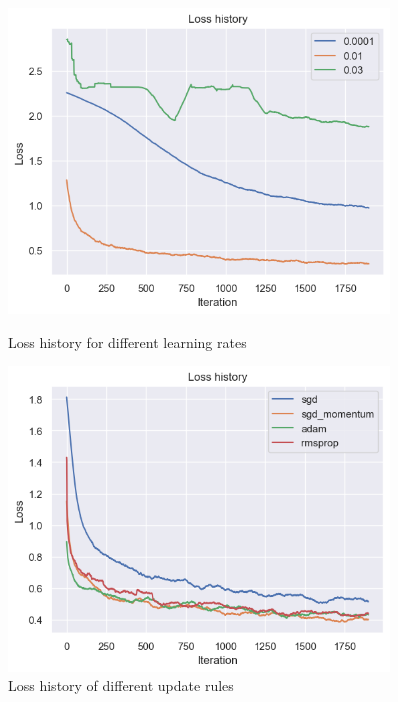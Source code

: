 \documentclass[10pt,a4paper,twoside]{tau}
\begin{document}
\begin{figure}[htbp]
    \centering
    \begin{minipage}{0.45\textwidth}
        \centering
        \includegraphics[width=0.9\textwidth]{images/learning_rate_loss.png}
        \caption{Loss history for different learning rates}
        \label{fig:lr-loss}
    \end{minipage}\hfill
    \begin{minipage}{0.45\textwidth}
        \centering
        \includegraphics[width=0.9\textwidth]{images/update_rule_loss.png}
        \caption{Loss history of different update rules}
        \label{fig:update-rule}
    \end{minipage}
\end{figure}
\end{document}
